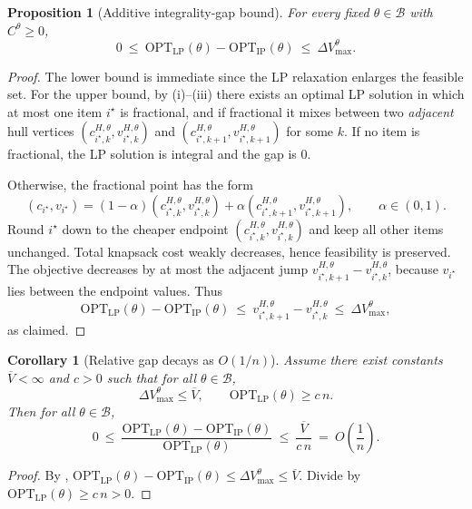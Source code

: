 \documentclass[11pt, a4paper]{article}
\theoremstyle{plain}
\newtheorem{proposition}[proposition]{Proposition}
\newtheorem{corollary}[corollary]{Corollary}
\theoremstyle{definition}
\theoremstyle{remark}
\begin{document}
\begin{proposition}[Additive integrality-gap bound]\label{prop:igap_additive_theta_clean}
For every fixed $\theta\in\mathcal B$ with $C^\theta\ge 0$,
\[
0\ \le\ \mathrm{OPT}_{\mathrm{LP}}(\theta)-\mathrm{OPT}_{\mathrm{IP}}(\theta)\ \le\ \Delta V_{\max}^\theta .
\]
\end{proposition}

\begin{proof}
The lower bound is immediate since the LP relaxation enlarges the feasible set. For the upper bound, by
(i)--(iii) there exists an optimal LP solution in which at most one item $i^\star$ is fractional, and if fractional
it mixes between two \emph{adjacent} hull vertices $(c^{H,\theta}_{i^\star,k},v^{H,\theta}_{i^\star,k})$ and
$(c^{H,\theta}_{i^\star,k+1},v^{H,\theta}_{i^\star,k+1})$ for some $k$. If no item is fractional, the LP solution is integral and the gap
is $0$.

Otherwise, the fractional point has the form
\[
(c_{i^\star},v_{i^\star})
=(1-\alpha)(c^{H,\theta}_{i^\star,k},v^{H,\theta}_{i^\star,k})+\alpha(c^{H,\theta}_{i^\star,k+1},v^{H,\theta}_{i^\star,k+1}),
\qquad \alpha\in(0,1).
\]
Round $i^\star$ down to the cheaper endpoint $(c^{H,\theta}_{i^\star,k},v^{H,\theta}_{i^\star,k})$ and keep all other items unchanged.
Total knapsack cost weakly decreases, hence feasibility is preserved. The objective decreases by at most the adjacent jump
$v^{H,\theta}_{i^\star,k+1}-v^{H,\theta}_{i^\star,k}$, because $v_{i^\star}$ lies between the endpoint values. Thus
\[
\mathrm{OPT}_{\mathrm{LP}}(\theta)-\mathrm{OPT}_{\mathrm{IP}}(\theta)
\ \le\ v^{H,\theta}_{i^\star,k+1}-v^{H,\theta}_{i^\star,k}
\ \le\ \Delta V_{\max}^\theta,
\]
as claimed.
\end{proof}

\begin{corollary}[Relative gap decays as \(O(1/n)\)]\label{cor:igap_relative_theta_clean}
Assume there exist constants $\overline V<\infty$ and $c>0$ such that for all $\theta\in\mathcal B$,
\[
\Delta V_{\max}^\theta\le \overline V,
\qquad
\mathrm{OPT}_{\mathrm{LP}}(\theta)\ge c\,n.
\]
Then for all $\theta\in\mathcal B$,
\[
0\ \le\
\frac{\mathrm{OPT}_{\mathrm{LP}}(\theta)-\mathrm{OPT}_{\mathrm{IP}}(\theta)}{\mathrm{OPT}_{\mathrm{LP}}(\theta)}
\ \le\
\frac{\overline V}{c\,n}
\ =\ O\!\left(\frac{1}{n}\right).
\]
\end{corollary}

\begin{proof}
By ,
$\mathrm{OPT}_{\mathrm{LP}}(\theta)-\mathrm{OPT}_{\mathrm{IP}}(\theta)\le \Delta V_{\max}^\theta\le \overline V$.
Divide by $\mathrm{OPT}_{\mathrm{LP}}(\theta)\ge c\,n>0$.
\end{proof}
\end{document}
